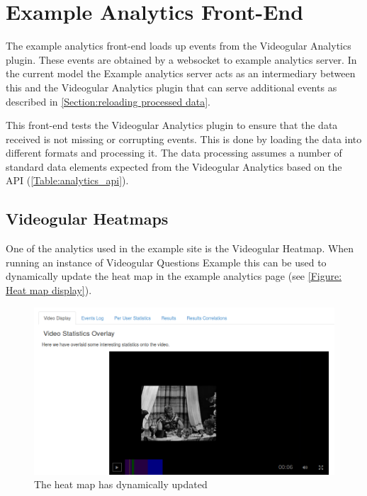 \section{Example Analytics Front-End}

The example analytics front-end loads up events from the Videogular Analytics plugin. These events are obtained by a websocket to example analytics server. In the current model the Example analytics server acts as an intermediary between this and the Videogular Analytics plugin that can serve additional events as described in \autoref{Section:reloading processed data}.

This front-end tests the Videogular Analytics plugin to ensure that the data received is not missing or corrupting events. This is done by loading the data into different formats and processing it. The data processing assumes a number of standard data elements expected from the Videogular Analytics based on the API (\autoref{Table:analytics_api}).

\subsection{Videogular Heatmaps}
\label{Subsubsection:Videogular Heatmaps in example}

One of the analytics used in the example site is the \gls{Videogular} Heatmap. When running an instance of \gls{Videogular} Questions Example this can be used to dynamically update the heat map in the example analytics page (see \autoref{Figure: Heat map display}).

\begin{figure}[h]
	\centering
		\includegraphics[scale=0.4]{../figures/heatmapDisplay.png}
	\caption{\label{Figure: Heat map display} The heat map has dynamically updated}
\end{figure}

